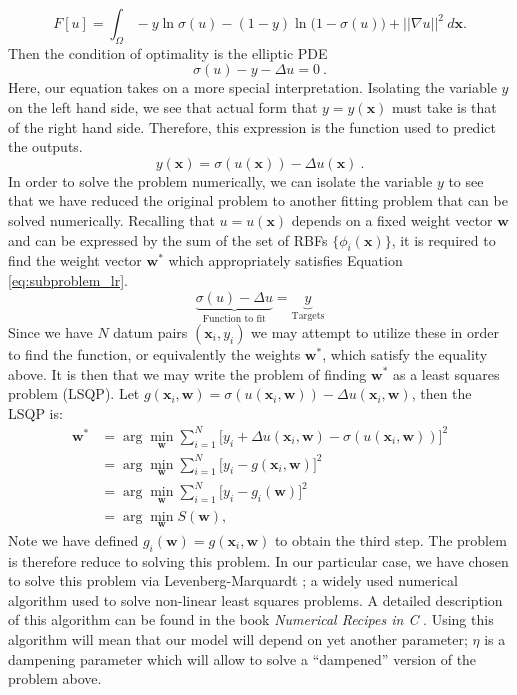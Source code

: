 \documentclass{INGUADY}
\begin{document}
\begin{equation*}
F[u] = \int_\Omega -y \ln \sigma(u)  - (1 - y) \ln \big(  1-  \sigma(u)  \big)   +  ||  \nabla u  ||^2   \ d\mathbf{x}.
\end{equation*}
Then the condition of optimality is the elliptic PDE 
\begin{equation*}
\sigma(u) - y - \Delta u = 0 \ .
\end{equation*}
Here, our equation takes on a more special interpretation. Isolating the variable $y$ on the left hand side, we see that actual form that $y= y(\mathbf{x})$ must take is that of the right hand side. Therefore, this expression is the function used to predict the outputs.
\begin{equation*}
y(\mathbf{x}) = \sigma(u(\mathbf{x})) - \Delta u(\mathbf{x}) \ .
\end{equation*}
In order to solve the problem numerically, we can isolate the variable $y$ to see that we have reduced the original problem to another fitting problem that can be solved numerically. Recalling that $u = u(\mathbf{x})$ depends on a fixed weight vector $\mathbf{w}$ and can be expressed by the sum of the set of RBFs $\{ \phi_i(\mathbf{x}) \}$, it is required to find the weight vector $\mathbf{w}^*$ which appropriately satisfies Equation \ref{eq:subproblem_lr}.
\begin{equation} \label{eq:subproblem_lr}
\underbrace{ \sigma(u) - \Delta u}_{\text{Function to fit}}   = \underbrace{y}_{\text{Targets}}
\end{equation}
Since we have $N$ datum pairs $(\mathbf{x}_i, y_i)$ we may attempt to utilize these in order to find the function, or equivalently the weights $\mathbf{w}^*$, which satisfy the equality above. It is then that we may write the problem of finding $\mathbf{w}^*$ as a least squares problem (LSQP). Let $g(\mathbf{x}_i, \mathbf{w}) = \sigma(u(\mathbf{x}_i, \mathbf{w})) - \Delta u(\mathbf{x}_i, \mathbf{w})$, then the LSQP is:
\begin{align}
\mathbf{w}^* &= \arg \min_{\mathbf{w}} \sum^N_{i=1} \big[   y_i   +  \Delta u(\mathbf{x}_i, \mathbf{w})  -  \sigma(u(\mathbf{x}_i, \mathbf{w}))    \big]^2 \\
&= \arg \min_{\mathbf{w}} \sum^N_{i=1} \big[ y_i - g(\mathbf{x}_i, \mathbf{w})  \big]^2  \\
&=  \arg \min_{\mathbf{w}} \sum^N_{i=1} \big[ y_i - g_i(\mathbf{w})  \big]^2 \\
&= \arg \min_\mathbf{w} S(\mathbf{w}) \label{eq:least_squares},
\end{align}
Note we have defined $g_i(\mathbf{w}) = g(\mathbf{x}_i, \mathbf{w})$ to obtain the third step. The problem is therefore reduce to solving this problem. In our particular case, we have chosen to solve this problem via Levenberg-Marquardt \cite{levenberg}; a widely used numerical algorithm used to solve non-linear least squares problems. A detailed description of this algorithm can be found in  the book \textit{Numerical Recipes in C} \cite{williamnum}. Using this algorithm will mean that our model will depend on yet another parameter; $\eta$ is a dampening parameter which will allow to solve a ``dampened'' version of the problem above.
\end{document}
